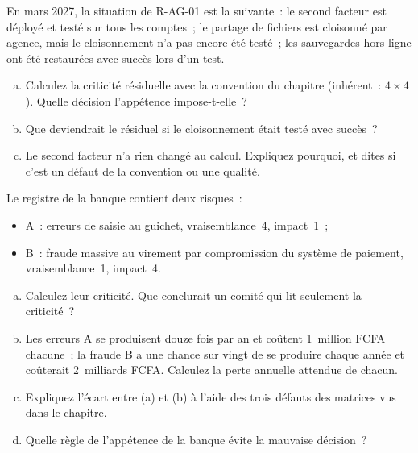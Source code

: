 \begin{boxexo}[title={\ding{45}\quad Exercice~2.2. Six mois après \niveaumoyen}]
En mars 2027, la situation de R-AG-01 est la suivante~: le second facteur
est déployé et testé sur tous les comptes~; le partage de fichiers est
cloisonné par agence, mais le cloisonnement n'a pas encore été testé~; les
sauvegardes hors ligne ont été restaurées avec succès lors d'un test.
\begin{enumerate}[(a)]
    \item Calculez la criticité résiduelle avec la convention du chapitre
          (inhérent~: $4 \times 4$). Quelle décision l'appétence impose-t-elle~?
    \item Que deviendrait le résiduel si le cloisonnement était testé avec
          succès~?
    \item Le second facteur n'a rien changé au calcul. Expliquez pourquoi,
          et dites si c'est un défaut de la convention ou une qualité.
\end{enumerate}
\end{boxexo}

\begin{boxexo}[title={\ding{45}\quad Exercice~2.3. Ce que cache la matrice \niveaumoyen}]
Le registre de la banque contient deux risques~:
\begin{itemize}
    \item A~: erreurs de saisie au guichet, vraisemblance~4, impact~1~;
    \item B~: fraude massive au virement par compromission du système de
          paiement, vraisemblance~1, impact~4.
\end{itemize}
\begin{enumerate}[(a)]
    \item Calculez leur criticité. Que conclurait un comité qui lit
          seulement la criticité~?
    \item Les erreurs A se produisent douze fois par an et coûtent
          1~million FCFA chacune~; la fraude B a une chance sur vingt de se
          produire chaque année et coûterait 2~milliards FCFA. Calculez la
          perte annuelle attendue de chacun.
    \item Expliquez l'écart entre (a) et (b) à l'aide des trois défauts des
          matrices vus dans le chapitre.
    \item Quelle règle de l'appétence de la banque évite la mauvaise
          décision~?
\end{enumerate}
\end{boxexo}

